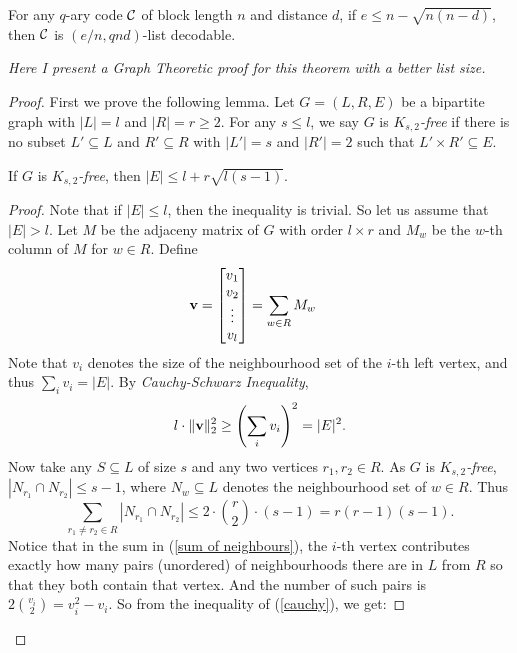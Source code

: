 	\begin{theorem}
		For any $q$-ary code $\mathcal{C}$ of block length $n$ and distance $d$, if $e\leq n - \sqrt{n(n - d)}$, then $\mathcal{C}$ is $(e/n, qnd)$-list decodable.
	\end{theorem}
	\emph{Here I present a Graph Theoretic proof for this theorem with a better list size.}
	\begin{proof}
		First we prove the following lemma. 	Let $G = (L,R,E)$ be a bipartite graph with $|L| = l$ and $|R| = r\geq 2$. For any $s\leq l$, we say $G$ is $K_{s,2}$\emph{-free} if there is no subset $L'\subseteq L$ and $R'\subseteq R$ with $|L'| = s$ and $|R'| = 2$ such that $L'\times R'\subseteq E$.
		
		\begin{lemma}[]
			\label{bip_free}
		 If $G$ is $K_{s,2}$\emph{-free}, then $|E| \leq l + r\sqrt{l(s-1)}$.
		\end{lemma}
		\begin{proof}
			Note that if $|E|\leq l$, then the inequality is trivial. So let us assume that $|E|>l$. Let $M$ be the adjaceny matrix of $G$ with order $l\times r$ and $M_w$ be the $w$-th column of $M$ for $w\in R$. Define
			\begin{align*}
			\mathbf{v} 
			& = \begin{bmatrix}
 					v_1 \\
 					v_2 \\
 					\vdots \\
 					v_l
			\end{bmatrix} = \sum_{w\in R} M_w
			\end{align*}
			Note that $v_i$ denotes the size of the neighbourhood set of the $i$-th left vertex, and thus $\sum_i v_i = |E|$. By \emph{Cauchy-Schwarz Inequality}, 
			\begin{equation}
				\label{cauchy}
					l\cdot\lVert \mathbf{v} \rVert_2^2 \geq \left(\sum_i v_i\right)^2 = |E|^2.
			\end{equation}
			 Now take any $S\subseteq L$ of size $s$ and any two vertices $r_1,r_2\in R$. As $G$ is $K_{s,2}$\emph{-free}, $|N_{r_1}\cap N_{r_2}|\leq s-1$, where $N_w\subseteq L$ denotes the neighbourhood set of $w\in R$. Thus 
			 \begin{equation}
			 	\label{sum of neighbours}
			 \sum_{r_1\neq r_2 \in R} |N_{r_1}\cap N_{r_2}| \leq 2\cdot\binom{r}{2}\cdot(s-1) = r(r-1)(s-1).
			 \end{equation}
			 Notice that in the sum in (\ref{sum of neighbours}), the $i$-th vertex contributes exactly how many pairs (unordered) of neighbourhoods there are in $L$ from $R$ so that they both contain that vertex. And the number of such pairs is $2\binom{v_i}{2} = v_i^2 - v_i$. So from the inequality of (\ref{cauchy}), we get:

\end{proof}
\end{proof}
